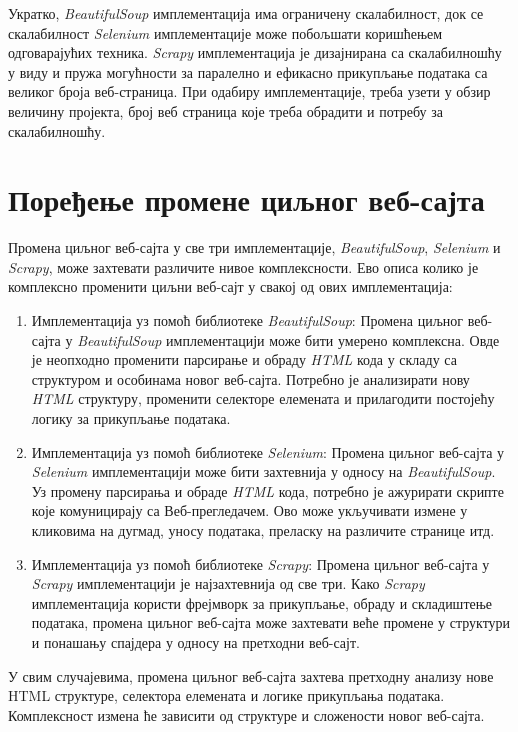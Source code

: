 \documentclass[12pt,oneside]{memoir}
\begin{document}
Укратко, \textit{BeautifulSoup} имплементација има ограничену скалабилност, док се скалабилност \textit{Selenium} имплементације може побољшати коришћењем одговарајућих техника. \textit{Scrapy} имплементација је дизајнирана са скалабилношћу у виду и пружа могућности за паралелно и ефикасно прикупљање података са великог броја веб-страница. При одабиру имплементације, треба узети у обзир величину пројекта, број веб страница које треба обрадити и потребу за скалабилношћу.

\section{Поређење промене циљног веб-сајта}
Промена циљног веб-сајта у све три имплементације, \textit{BeautifulSoup},  \textit{Selenium} и \textit{Scrapy}, може захтевати различите нивое комплексности. Ево описа колико је комплексно променити циљни веб-сајт у свакој од ових имплементација:

\begin{enumerate}
\item Имплементација уз помоћ библиотеке \textit{BeautifulSoup}:
    Промена циљног веб-сајта у \textit{BeautifulSoup} имплементацији може бити умерено комплексна. Овде је неопходно променити парсирање и обраду \textit{HTML} кода у складу са структуром и особинама новог веб-сајта. Потребно је анализирати нову \textit{HTML} структуру, променити селекторе елемената и прилагодити постојећу логику за прикупљање података.
\item Имплементација уз помоћ библиотеке \textit{Selenium}:
    Промена циљног веб-сајта у \textit{Selenium} имплементацији може бити захтевнија у односу на \textit{BeautifulSoup}. Уз промену парсирања и обраде \textit{HTML} кода, потребно је ажурирати скрипте које комуницирају са Веб-прегледачем. Ово може укључивати измене у кликовима на дугмад, уносу података, преласку на различите странице итд.
\item Имплементација уз помоћ библиотеке \textit{Scrapy}:
    Промена циљног веб-сајта у \textit{Scrapy} имплементацији је најзахтевнија од све три. Како \textit{Scrapy} имплементација користи фрејмворк за прикупљање, обраду и складиштење података, промена циљног веб-сајта може захтевати веће промене у структури и понашању спајдера у односу на претходни веб-сајт.
\end{enumerate}

У свим случајевима, промена циљног веб-сајта захтева претходну анализу нове HTML структуре, селектора елемената и логике прикупљања података. Комплексност измена ће зависити од структуре и сложености новог веб-сајта.
\end{document}
